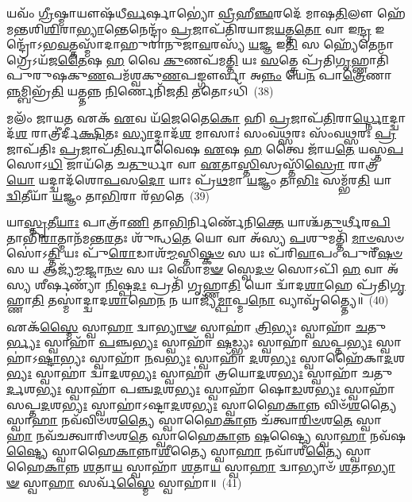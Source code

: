 𑌯𑌵𑌂᳴ \ul{𑌗𑍍𑌰𑍀}\-𑌷𑍍𑌮𑌾𑌯𑍗𑌷᳴𑌧𑍀\-\ul{𑌰𑍍𑌵}\-𑌰𑍍\mbox{}𑌷𑌾𑌭𑍍𑌯𑍋॑ \ul{𑌵𑍍𑌰𑍀}\-𑌹𑍀\-\ul{𑌞𑍍𑌛}\-𑌰𑌦𑍇᳴ 𑌮𑌾𑌷\-\ul{𑌤𑌿}\-𑌲𑍗 𑌹𑍇᳴𑌮𑌨𑍍𑌤𑌶𑌿\-\ul{𑌶𑌿}\-𑌰𑌾\-\ul{𑌭𑍍𑌯𑌾}\-𑌨𑍍𑌤𑍇𑌨𑍇𑌨𑍍𑌦𑍍𑌰𑌂᳴ \ul{𑌪𑍍𑌰}\-𑌜𑌾𑌪᳴𑌤𑌿𑌰𑌯𑌾𑌜\-\ul{𑌯}\-𑌤𑍍𑌤\-\ul{𑌤𑍋} 𑌵𑌾 𑌇\-\ul{𑌨𑍍𑌦𑍍𑌰} 𑌇𑌨𑍍𑌦𑍍𑌰𑍋᳴\-𑌽𑌭\-\ul{𑌵}\-𑌤𑍍𑌤𑌸𑍍𑌮𑌾᳴𑌦𑌾𑌹𑍁𑌰𑌾𑌨𑍁𑌜𑌾\-\ul{𑌵}\-𑌰𑌸𑍍𑌯᳴ \ul{𑌯}\-𑌜𑍍𑌞 𑌇\-\ul{𑌤𑌿} 𑌸 𑌹𑍍𑌯𑍇᳴𑌤𑍇𑌨𑌾𑌗𑍍𑌰𑍇\-𑌽𑌯᳴𑌜\-\ul{𑌤𑍈}\-𑌷 \ul{𑌹} 𑌵𑍈 \ul{𑌕𑍁}\-𑌣𑌪᳴𑌮\-\ul{𑌤𑍍𑌤𑌿} 𑌯𑌃 \ul{𑌸}\-𑌤𑍍𑌤𑍍𑌰𑍇 𑌪𑍍𑌰᳴𑌤𑌿\-\ul{𑌗𑍃}\-𑌹𑍍𑌣𑌾𑌤𑌿᳴ 𑌪𑍁𑌰𑍁𑌷𑌕𑍁\-\ul{𑌣}\-𑌪𑌮᳴𑌶𑍍𑌵𑌕𑍁\-\ul{𑌣}\-𑌪𑌙𑍍𑌗𑍗𑌰𑍍𑌵𑌾 𑌅\-\ul{𑌨𑍍𑌨𑌂} 𑌯𑍇\-\ul{𑌨} 𑌪𑌾\-\ul{𑌤𑍍𑌰𑍇}\-𑌣𑌾\-\ul{𑌨𑍍𑌨}\-𑌮𑍍𑌬𑌿𑌭𑍍𑌰᳴\-\ul{𑌤𑌿} 𑌯𑌤𑍍𑌤𑌨𑍍𑌨 \ul{𑌨𑌿}\-𑌰𑍍𑌣𑍇𑌨𑌿᳴𑌜\-\ul{𑌤𑌿} 𑌤𑌤𑍋\-𑌽𑌧𑌿᳴~(38)

𑌮𑌲𑌂᳴ 𑌜𑌾𑌯\-\ul{𑌤} 𑌏𑌕᳴ \ul{𑌏}\-𑌵 𑌯᳴\-\ul{𑌜𑍇}\-𑌤𑍈\-\ul{𑌕𑍋} 𑌹𑌿 \ul{𑌪𑍍𑌰}\-𑌜𑌾𑌪᳴\-\ul{𑌤𑌿}\-𑌰𑌾\-\ul{𑌰𑍍𑌧𑍍𑌨𑍋}\-𑌦𑍍𑌦𑍍𑌵𑌾𑌦᳴\-\ul{𑌶} 𑌰𑌾𑌤𑍍𑌰𑍀॑𑌰𑍍𑌦𑍀\-\ul{𑌕𑍍𑌷𑌿}\-𑌤𑌃 \ul{𑌸𑍍𑌯𑌾}\-𑌦𑍍𑌦𑍍𑌵𑌾𑌦᳴\-\ul{𑌶} 𑌮𑌾𑌸𑌾𑌃॑ 𑌸𑌂𑌵\-\ul{𑌥𑍍𑌸}\-𑌰𑌃 𑌸𑌂᳴𑌵\-\ul{𑌥𑍍𑌸}\-𑌰𑌃 \ul{𑌪𑍍𑌰}\-𑌜𑌾𑌪᳴𑌤𑌿𑌃 \ul{𑌪𑍍𑌰}\-𑌜𑌾𑌪᳴\-\ul{𑌤𑌿}\-𑌰𑍍𑌵𑌾𑌵𑍈𑌷 \ul{𑌏}\-𑌷 \ul{𑌹} 𑌤𑍍𑌵𑍈 𑌜𑌾᳴𑌯\-\ul{𑌤𑍇} 𑌯𑌸𑍍𑌤\-\ul{𑌪}\-𑌸𑍋\-𑌽\-\ul{𑌧𑌿} 𑌜𑌾𑌯᳴𑌤𑍇 𑌚\-\ul{𑌤𑍁}\-𑌰𑍍𑌧𑌾 𑌵𑌾 \ul{𑌏}\-𑌤𑌾\-\ul{𑌸𑍍𑌤𑌿}\-𑌸𑍍𑌰𑌸𑍍𑌤𑌿᳴\-\ul{𑌸𑍍𑌰𑍋} 𑌰𑌾𑌤𑍍𑌰᳴\-\ul{𑌯𑍋} 𑌯𑌦𑍍𑌦𑍍𑌵𑌾𑌦᳴𑌶𑍋\-\ul{𑌪}\-𑌸\-\ul{𑌦𑍋} 𑌯𑌾𑌃 𑌪𑍍𑌰᳴\-\ul{𑌥}\-𑌮𑌾 \ul{𑌯}\-𑌜𑍍𑌞𑌂 𑌤𑌾\-\ul{𑌭𑌿𑌃} 𑌸𑌮𑍍𑌭᳴𑌰\-\ul{𑌤𑌿} 𑌯𑌾 \ul{𑌦𑍍𑌵𑌿}\-𑌤𑍀𑌯𑌾᳴ \ul{𑌯}\-𑌜𑍍𑌞𑌂 𑌤𑌾\-\ul{𑌭𑌿}\-𑌰𑌾 𑌰᳴𑌭𑌤𑍇~(39)

𑌯𑌾\-\ul{𑌸𑍍𑌤𑍃}\-𑌤𑍀\-\ul{𑌯𑌾𑌃} 𑌪𑌾𑌤𑍍𑌰𑌾᳴\-\ul{𑌣𑌿} 𑌤𑌾\-\ul{𑌭𑌿}\-𑌰𑍍𑌨𑌿𑌰𑍍𑌣𑍇᳴𑌨𑌿\-\ul{𑌕𑍍𑌤𑍇} 𑌯𑌾𑌶𑍍𑌚᳴\-\ul{𑌤𑍁}\-𑌰𑍍𑌥𑍀𑌰\-\ul{𑌪𑌿} 𑌤𑌾𑌭𑌿᳴\-\ul{𑌰𑌾}\-𑌤𑍍𑌮𑌾𑌨᳴𑌮𑌨𑍍𑌤\-\ul{𑌰}\-𑌤𑌃 𑌶𑍁᳴𑌨𑍍𑌧\-\ul{𑌤𑍇} 𑌯𑍋 𑌵𑌾 𑌅᳴𑌸𑍍𑌯 \ul{𑌪}\-𑌶𑍁𑌮𑌤𑍍𑌤𑌿᳴ \ul{𑌮𑌾}\-\-\ul{𑍞}\-𑌸𑍞 𑌸𑍋॑\-𑌽\-\ul{𑌤𑍍𑌤𑌿} 𑌯𑌃 𑌪𑍁᳴\-\ul{𑌰𑍋}\-𑌡𑌾𑌶᳴\-\ul{𑌮𑍍𑌮}\-𑌸𑍍𑌤𑌿\-\ul{𑌷𑍍𑌕}\-\-\ul{𑍞} 𑌸 𑌯𑌃 𑌪᳴𑌰𑌿\-\ul{𑌵𑌾}\-𑌪𑌂 𑌪𑍁𑌰𑍀᳴\-\ul{𑌷}\-\-\ul{𑍞} 𑌸 𑌯 𑌆𑌜𑍍𑌯᳴\-\ul{𑌮𑍍𑌮}\-𑌜𑍍𑌜𑌾\-\ul{𑌨}\-\-\ul{𑍞} 𑌸 𑌯𑌃 𑌸𑍋𑌮\-\ul{𑍟} 𑌸𑍍𑌵𑍇\-\ul{𑌦}\-\-\ul{𑍞} 𑌸𑍋\-𑌽𑌪𑌿᳴ \ul{𑌹} 𑌵𑌾 𑌅᳴𑌸𑍍𑌯 𑌶𑍀𑌰𑍍\mbox{}\-\ul{𑌷}\-𑌣𑍍𑌯𑌾᳴ \ul{𑌨𑌿}\-𑌷𑍍𑌪\-\ul{𑌦𑌃} 𑌪𑍍𑌰𑌤𑌿᳴ 𑌗𑍃𑌹𑍍𑌣𑌾\-\ul{𑌤𑌿} 𑌯𑍋 𑌦𑍍𑌵𑌾᳴𑌦\-\ul{𑌶𑌾}\-𑌹𑍇 𑌪𑍍𑌰᳴𑌤𑌿\-\ul{𑌗𑍃}\-𑌹𑍍𑌣𑌾\-\ul{𑌤𑌿} 𑌤𑌸𑍍𑌮𑌾॑𑌦𑍍𑌦𑍍𑌵𑌾𑌦\-\ul{𑌶𑌾}\-𑌹𑍇\-\ul{𑌨} 𑌨 𑌯𑌾𑌜𑍍𑌯᳴\-\ul{𑌮𑍍𑌪𑌾}\-𑌪𑍍𑌮\-\ul{𑌨𑍋} 𑌵𑍍𑌯𑌾𑌵𑍃᳴𑌤𑍍𑌤𑍍𑌯𑍈॥~(40)

{\anuvakamend[{𑌅𑌯᳴\-\ul{𑌚𑍍𑌛}\-𑌦𑌧𑌿᳴ 𑌰𑌭𑌤𑍇 𑌦𑍍𑌵𑌾𑌦\-\ul{𑌶𑌾}\-𑌹𑍇𑌨᳴ \ul{𑌚}\-𑌤𑍍𑌵𑌾𑌰𑌿᳴ 𑌚}]}%

𑌏𑌕᳴\-\ul{𑌸𑍍𑌮𑍈} 𑌸𑍍𑌵𑌾\-\ul{𑌹𑌾} 𑌦𑍍𑌵𑌾\-\ul{𑌭𑍍𑌯𑌾}\-\-\ul{𑍟} 𑌸𑍍𑌵𑌾𑌹𑌾॑ \ul{𑌤𑍍𑌰𑌿}\-𑌭𑍍𑌯𑌃 𑌸𑍍𑌵𑌾𑌹𑌾᳴ \ul{𑌚}\-𑌤𑍁\-\ul{𑌰𑍍𑌭𑍍𑌯𑌃} 𑌸𑍍𑌵𑌾𑌹𑌾᳴ \ul{𑌪}\-𑌞𑍍𑌚\-\ul{𑌭𑍍𑌯𑌃} 𑌸𑍍𑌵𑌾𑌹𑌾᳴ \ul{𑌷}\-𑌡𑍍𑌭𑍍𑌯𑌃 𑌸𑍍𑌵𑌾𑌹𑌾᳴ \ul{𑌸}\-𑌪𑍍𑌤\-\ul{𑌭𑍍𑌯𑌃} 𑌸𑍍𑌵𑌾𑌹𑌾॑\-𑌽\-\ul{𑌷𑍍𑌟𑌾}\-𑌭𑍍𑌯𑌃 𑌸𑍍𑌵𑌾𑌹𑌾᳴ \ul{𑌨}\-𑌵\-\ul{𑌭𑍍𑌯𑌃} 𑌸𑍍𑌵𑌾𑌹𑌾᳴ \ul{𑌦}\-𑌶\-\ul{𑌭𑍍𑌯𑌃} 𑌸𑍍𑌵𑌾𑌹𑍈᳴𑌕𑌾\-\ul{𑌦}\-𑌶\-\ul{𑌭𑍍𑌯𑌃} 𑌸𑍍𑌵𑌾𑌹𑌾॑ 𑌦𑍍𑌵𑌾\-\ul{𑌦}\-𑌶\-\ul{𑌭𑍍𑌯𑌃} 𑌸𑍍𑌵𑌾𑌹𑌾॑ 𑌤𑍍𑌰𑌯𑍋\-\ul{𑌦}\-𑌶\-\ul{𑌭𑍍𑌯𑌃} 𑌸𑍍𑌵𑌾𑌹𑌾᳴ 𑌚𑌤𑍁\-\ul{𑌰𑍍𑌦}\-𑌶\-\ul{𑌭𑍍𑌯𑌃} 𑌸𑍍𑌵𑌾𑌹𑌾᳴ 𑌪𑌞𑍍𑌚\-\ul{𑌦}\-𑌶\-\ul{𑌭𑍍𑌯𑌃} 𑌸𑍍𑌵𑌾𑌹𑌾᳴ 𑌷𑍋\-\ul{𑌡}\-𑌶\-\ul{𑌭𑍍𑌯𑌃} 𑌸𑍍𑌵𑌾𑌹𑌾᳴ 𑌸𑌪𑍍𑌤\-\ul{𑌦}\-𑌶\-\ul{𑌭𑍍𑌯𑌃} 𑌸𑍍𑌵𑌾𑌹𑌾॑\-𑌽𑌷𑍍𑌟𑌾\-\ul{𑌦}\-𑌶\-\ul{𑌭𑍍𑌯𑌃} 𑌸𑍍𑌵𑌾𑌹𑍈\-\ul{𑌕𑌾}\-𑌨𑍍𑌨 𑌵𑌿𑍞᳴\-\ul{𑌶}\-𑌤𑍍𑌯𑍈 𑌸𑍍𑌵𑌾\-\ul{𑌹𑌾} 𑌨𑌵᳴𑌵𑌿𑍞𑌶\-\ul{𑌤𑍍𑌯𑍈} 𑌸𑍍𑌵𑌾𑌹𑍈\-\ul{𑌕𑌾}\-𑌨𑍍𑌨 𑌚᳴𑌤𑍍𑌵𑌾\-\ul{𑌰𑌿}\-\-\ul{𑍞}\-𑌶\-\ul{𑌤𑍇} 𑌸𑍍𑌵𑌾\-\ul{𑌹𑌾} 𑌨𑌵᳴𑌚𑌤𑍍𑌵𑌾𑌰𑌿𑍞𑌶\-\ul{𑌤𑍇} 𑌸𑍍𑌵𑌾𑌹𑍈\-\ul{𑌕𑌾}\-𑌨𑍍𑌨 \ul{𑌷}\-𑌷𑍍𑌟𑍍𑌯𑍈 𑌸𑍍𑌵𑌾\-\ul{𑌹𑌾} 𑌨𑌵᳴𑌷\-\ul{𑌷𑍍𑌟𑍍𑌯𑍈} 𑌸𑍍𑌵𑌾𑌹𑍈\-\ul{𑌕𑌾}\-𑌨𑍍𑌨𑌾\-\ul{𑌶𑍀}\-𑌤𑍍𑌯𑍈 𑌸𑍍𑌵𑌾\-\ul{𑌹𑌾} 𑌨𑌵𑌾᳴𑌶𑍀\-\ul{𑌤𑍍𑌯𑍈} 𑌸𑍍𑌵𑌾𑌹𑍈\-\ul{𑌕𑌾}\-𑌨𑍍𑌨 \ul{𑌶}\-𑌤𑌾\-\ul{𑌯} 𑌸𑍍𑌵𑌾𑌹𑌾᳴ \ul{𑌶}\-𑌤𑌾\-\ul{𑌯} 𑌸𑍍𑌵𑌾\-\ul{𑌹𑌾} 𑌦𑍍𑌵𑌾𑌭𑍍𑌯𑌾𑍞᳴ \ul{𑌶}\-𑌤𑌾\-\ul{𑌭𑍍𑌯𑌾}\-\-\ul{𑍟} 𑌸𑍍𑌵𑌾\-\ul{𑌹𑌾} 𑌸𑌰𑍍𑌵᳴\-\ul{𑌸𑍍𑌮𑍈} 𑌸𑍍𑌵𑌾𑌹𑌾॑॥~(41)

